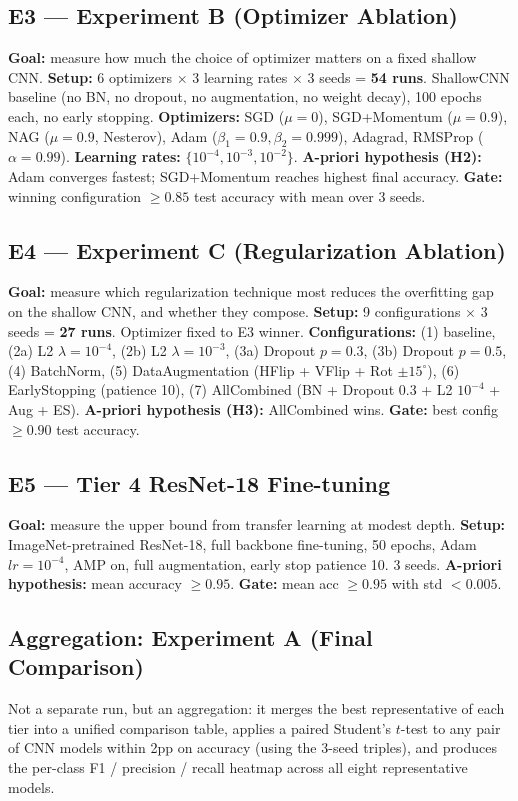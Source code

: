 \documentclass[10pt,letterpaper]{article}
\begin{document}
\subsection{E3 --- Experiment B (Optimizer Ablation)}
\textbf{Goal:} measure how much the choice of optimizer matters on a fixed shallow CNN.
\textbf{Setup:} 6 optimizers $\times$ 3 learning rates $\times$ 3 seeds = \textbf{54 runs}. ShallowCNN baseline (no BN, no dropout, no augmentation, no weight decay), 100 epochs each, no early stopping.
\textbf{Optimizers:} SGD ($\mu{=}0$), SGD+Momentum ($\mu{=}0.9$), NAG ($\mu{=}0.9$, Nesterov), Adam ($\beta_1{=}0.9, \beta_2{=}0.999$), Adagrad, RMSProp ($\alpha{=}0.99$).
\textbf{Learning rates:} $\{10^{-4}, 10^{-3}, 10^{-2}\}$.
\textbf{A-priori hypothesis (H2):} Adam converges fastest; SGD+Momentum reaches highest final accuracy.
\textbf{Gate:} winning configuration $\geq 0.85$ test accuracy with mean over 3 seeds.

\subsection{E4 --- Experiment C (Regularization Ablation)}
\textbf{Goal:} measure which regularization technique most reduces the overfitting gap on the shallow CNN, and whether they compose.
\textbf{Setup:} 9 configurations $\times$ 3 seeds = \textbf{27 runs}. Optimizer fixed to E3 winner.
\textbf{Configurations:} (1) baseline, (2a) L2 $\lambda{=}10^{-4}$, (2b) L2 $\lambda{=}10^{-3}$, (3a) Dropout $p{=}0.3$, (3b) Dropout $p{=}0.5$, (4) BatchNorm, (5) DataAugmentation (HFlip + VFlip + Rot $\pm 15^\circ$), (6) EarlyStopping (patience 10), (7) AllCombined (BN + Dropout 0.3 + L2 $10^{-4}$ + Aug + ES).
\textbf{A-priori hypothesis (H3):} AllCombined wins.
\textbf{Gate:} best config $\geq 0.90$ test accuracy.

\subsection{E5 --- Tier 4 ResNet-18 Fine-tuning}
\textbf{Goal:} measure the upper bound from transfer learning at modest depth.
\textbf{Setup:} ImageNet-pretrained ResNet-18, full backbone fine-tuning, 50 epochs, Adam $lr{=}10^{-4}$, AMP on, full augmentation, early stop patience 10. 3 seeds.
\textbf{A-priori hypothesis:} mean accuracy $\geq 0.95$.
\textbf{Gate:} mean acc $\geq 0.95$ with std $< 0.005$.

\subsection{Aggregation: Experiment A (Final Comparison)}
Not a separate run, but an aggregation: it merges the best representative of each tier into a unified comparison table, applies a paired Student's $t$-test to any pair of CNN models within 2pp on accuracy (using the 3-seed triples), and produces the per-class F1 / precision / recall heatmap across all eight representative models.
\end{document}
